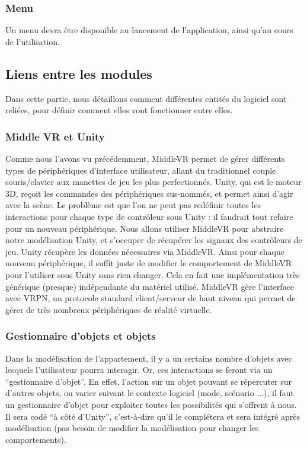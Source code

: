 		\subsubsection{Menu}
			Un menu devra être disponible au lancement de l'application, ainsi qu'au cours de l'utilisation.

%
%
\subsection{Liens entre les modules}
Dans cette partie, nous détaillons comment différentes entités du logiciel sont reliées, pour définir comment elles vont fonctionner entre elles.

\subsubsection{Middle VR et Unity}
Comme nous l'avons vu précédemment, MiddleVR permet de gérer différents types de périphériques d'interface utilisateur, allant du traditionnel couple souris/clavier aux manettes de jeu les plus perfectionnés.
Unity, qui est le moteur 3D, reçoit les commandes des périphériques sus-nommés, et permet ainsi d'agir avec la scène.
Le problème est que l'on ne peut pas redéfinir toutes les interactions pour chaque type de contrôleur sous Unity : il faudrait tout refaire pour un nouveau périphérique.
Nous allons utiliser MiddleVR pour abstraire notre modélisation Unity, et s'occuper de récupérer les signaux des contrôleurs de jeu. Unity récupère les données nécessaires via MiddleVR.
Ainsi pour chaque nouveau périphérique, il suffit juste de modifier le comportement de MiddleVR pour l'utiliser sous Unity sans rien changer.
Cela en fait une implémentation très générique (presque) indépendante du matériel utilisé.
MiddleVR gère l'interface avec VRPN, un protocole standard client/serveur de haut niveau qui permet de gérer de très nombreux périphériques de réalité virtuelle.

\subsubsection{Gestionnaire d'objets et objets}

Dans la modélisation de l'appartement, il y a un certains nombre d'objets avec lesquels l'utilisateur pourra interagir.
Or, ces interactions se feront via un \enquote{gestionnaire d'objet}.
En effet, l'action sur un objet pouvant se répercuter sur d'autres objets, ou varier suivant le contexte logiciel (mode, scénario ...), il faut un gestionnaire d'objet pour exploiter toutes les possibilités qui s'offrent à nous.
Il sera codé \enquote{à côté d'Unity}, c'est-à-dire qu'il le complétera et sera intégré après modélisation (pas besoin de modifier la modélisation pour changer les comportements).


